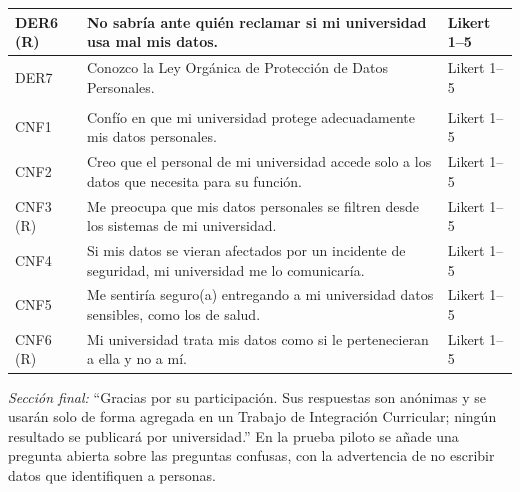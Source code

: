 {\begin{xltabular}{\textwidth}{|>{\raggedright\arraybackslash}p{1.1cm}|>{\raggedright\arraybackslash}X|>{\raggedright\arraybackslash}p{4.6cm}|}
  DER6 (R) & No sabría ante quién reclamar si mi universidad usa mal mis datos. & Likert 1--5 \\ \hline
  DER7 & Conozco la Ley Orgánica de Protección de Datos Personales. & Likert 1--5 \\ \hline
   \\ \hline
  CNF1 & Confío en que mi universidad protege adecuadamente mis datos personales. & Likert 1--5 \\ \hline
  CNF2 & Creo que el personal de mi universidad accede solo a los datos que necesita para su función. & Likert 1--5 \\ \hline
  CNF3 (R) & Me preocupa que mis datos personales se filtren desde los sistemas de mi universidad. & Likert 1--5 \\ \hline
  CNF4 & Si mis datos se vieran afectados por un incidente de seguridad, mi universidad me lo comunicaría. & Likert 1--5 \\ \hline
  CNF5 & Me sentiría seguro(a) entregando a mi universidad datos sensibles, como los de salud. & Likert 1--5 \\ \hline
  CNF6 (R) & Mi universidad trata mis datos como si le pertenecieran a ella y no a mí. & Likert 1--5 \\
\end{xltabular}
}

\noindent\textit{Sección final:} ``Gracias por su participación. Sus respuestas son anónimas y se usarán solo de forma agregada en un Trabajo de Integración Curricular; ningún resultado se publicará por universidad.'' En la prueba piloto se añade una pregunta abierta sobre las preguntas confusas, con la advertencia de no escribir datos que identifiquen a personas.
